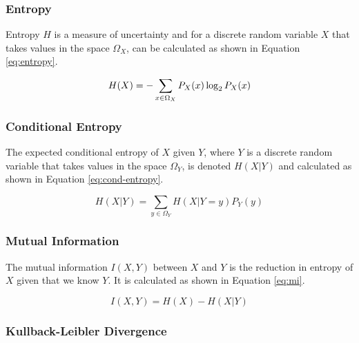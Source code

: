 \documentclass[a4paper,11pt]{article}
\begin{document}
\subsubsection{Entropy}
\label{sec:bg:entropy}

Entropy $H$ is a measure of uncertainty and for a discrete random variable $X$ that takes values in the space $\Omega_X$, can be calculated as shown in Equation \ref{eq:entropy}.

\begin{equation} \label{eq:entropy}
H(X) = - \sum_{x \in \Omega_X}P_X(x) \log_2 P_X(x)\\[2.5mm]
\end{equation}

\subsubsection{Conditional Entropy}
\label{sec:bg:cond-entropy}

The expected conditional entropy of $X$ given $Y$, where $Y$ is a discrete random variable that takes values in the space $\Omega_Y$, is denoted $H(X|Y)$ and calculated as shown in Equation \ref{eq:cond-entropy}.

\begin{equation}
\label{eq:cond-entropy}
H(X|Y) = \sum_{y \in \Omega_Y}H(X|Y=y)P_Y(y)
\end{equation}

\subsubsection{Mutual Information}
\label{sec:bg:mi}

The mutual information $I(X,Y)$ between $X$ and $Y$ is the reduction in entropy of $X$ given that we know $Y$. It is calculated as shown in Equation \ref{eq:mi}.

\begin{equation}
\label{eq:mi}
I(X,Y) = H(X) - H(X|Y)
\end{equation}

\subsubsection{Kullback-Leibler Divergence}
\label{sec:bg:kld}
\end{document}
